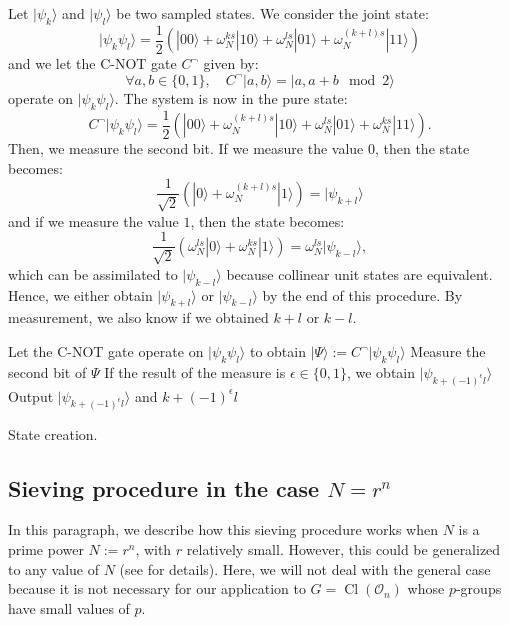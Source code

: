 \documentclass[a4paper,10pt]{report}
\theoremstyle{definition}
\theoremstyle{plain}
\theoremstyle{definition}
\newcommand{\mO}{\mathcal{O}}
\renewcommand{\(}{\left(}
\renewcommand{\)}{\right)}
\DeclareMathOperator{\Cl}{Cl}
\begin{document}
Let $|\psi_k\rangle$ and $|\psi_l\rangle$ be two sampled states. We consider the joint state:
\[|\psi_k\psi_l\rangle=\frac{1}{2}\(|00\rangle+\omega_N^{ks}|10\rangle+\omega_N^{ls}|01\rangle+\omega_N^{(k+l)s}|11\rangle\)\]
and we let the C-NOT gate $C^{\lnot}$ given by:
\[\forall a, b\in\{0,1\}, \quad C^{\lnot}|a,b\rangle=|a,a+b \mod 2\rangle\]
operate on $|\psi_k\psi_l\rangle$. The system is now in the pure state:
\[C^{\lnot}|\psi_k\psi_l\rangle=\frac{1}{2}\(|00\rangle+\omega_N^{(k+l)s}|10\rangle+\omega_N^{ls}|01\rangle+\omega_N^{ks}|11\rangle\).\]
Then, we measure the second bit. If we measure the value $0$, then the state becomes:
\[\frac{1}{\sqrt{2}}\(|0\rangle +\omega_N^{(k+l)s}|1\rangle\)=|\psi_{k+l}\rangle\]
and if we measure the value $1$, then the state becomes:
\[\frac{1}{\sqrt{2}}\(\omega_N^{ls}|0\rangle +\omega_N^{ks}|1\rangle\)=\omega_N^{ls}|\psi_{k-l}\rangle,\]
which can be assimilated to $|\psi_{k-l}\rangle$ because collinear unit states are equivalent. Hence, we either obtain $|\psi_{k+l}\rangle$ or $|\psi_{k-l}\rangle$ by the end of this procedure.  By measurement, we also know if we obtained $k+l$ or $k-l$.

\begin{algorithm}[!h]\label{algorithm 13}
\SetAlgoLined
{}

Let the C-NOT gate operate on $|\psi_k\psi_l\rangle$ to obtain $|\Psi\rangle:=C^{\lnot}|\psi_k\psi_l\rangle$\;
Measure the second bit of $\Psi$\;
If the result of the measure is $\epsilon\in\{0,1\}$, we obtain $|\psi_{k+(-1)^\epsilon l}\rangle$\;
Output $|\psi_{k+(-1)^\epsilon l}\rangle$ and $k+(-1)^\epsilon l$\;

\caption{State creation.}
\end{algorithm}

\subsection{Sieving procedure in the case $N=r^n$}

In this paragraph, we describe how this sieving procedure works when $N$ is a prime power $N:=r^n$, with $r$ relatively small. However, this could be generalized to any value of $N$ (see \cite[algorithm 2]{Kuperberg} for details). Here, we will not deal with the general case because it is not necessary for our application to $G=\Cl(\mO_n)$ whose $p$-groups have small values of $p$.
\end{document}
